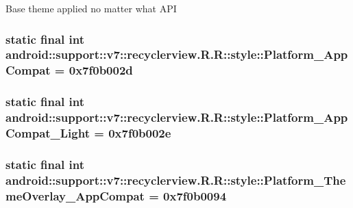 Base theme applied no matter what API \hypertarget{classandroid_1_1support_1_1v7_1_1recyclerview_1_1_r_1_1style_40abf5f68c993930c7f339c9a41dcc0f}{
\subsubsection[{Platform\_\-AppCompat}]{\setlength{\rightskip}{0pt plus 5cm}static final int android::support::v7::recyclerview.R.R::style::Platform\_\-AppCompat = 0x7f0b002d}}
\label{classandroid_1_1support_1_1v7_1_1recyclerview_1_1_r_1_1style_40abf5f68c993930c7f339c9a41dcc0f}


\hypertarget{classandroid_1_1support_1_1v7_1_1recyclerview_1_1_r_1_1style_757c3537e2f67d40ef2cecce1888e56b}{
\subsubsection[{Platform\_\-AppCompat\_\-Light}]{\setlength{\rightskip}{0pt plus 5cm}static final int android::support::v7::recyclerview.R.R::style::Platform\_\-AppCompat\_\-Light = 0x7f0b002e}}
\label{classandroid_1_1support_1_1v7_1_1recyclerview_1_1_r_1_1style_757c3537e2f67d40ef2cecce1888e56b}


\hypertarget{classandroid_1_1support_1_1v7_1_1recyclerview_1_1_r_1_1style_fd6d88bf957b7fbbdf1b133757f55d0b}{
\subsubsection[{Platform\_\-ThemeOverlay\_\-AppCompat}]{\setlength{\rightskip}{0pt plus 5cm}static final int android::support::v7::recyclerview.R.R::style::Platform\_\-ThemeOverlay\_\-AppCompat = 0x7f0b0094}}
\label{classandroid_1_1support_1_1v7_1_1recyclerview_1_1_r_1_1style_fd6d88bf957b7fbbdf1b133757f55d0b}


